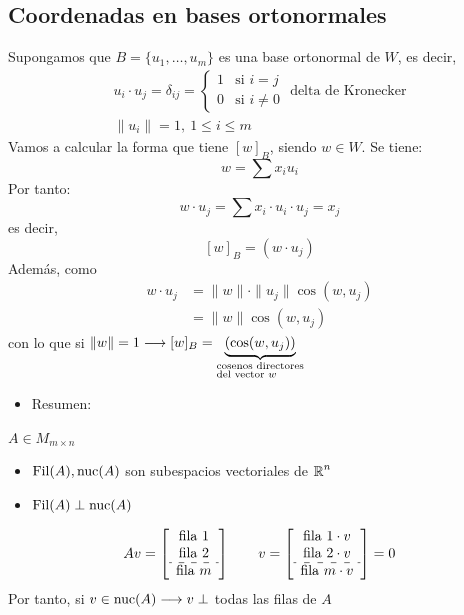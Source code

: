 \subsection{Coordenadas en bases ortonormales}
Supongamos que $B=\{u_1,\dots,u_m\}$ es una base ortonormal de $W$, es decir, \[ \begin{array}{l}
	u_i\cdot u_j=\delta_{ij}=\begin{cases}
		1 & \text{si }i=j\\
		0 & \text{si }i\neq0
	\end{cases}\text{ delta de Kronecker}\\
	\|u_i\|=1,\:1\le i\le m
\end{array} \]
Vamos a calcular la forma que tiene $[w]_B$, siendo $w\in W$. Se tiene: \[ w=\sum x_iu_i \]Por tanto: \[w\cdot u_j=\sum x_i\cdot u_i\cdot u_j=x_j \]es decir, \[ [w]_B=(w\cdot u_j) \]
Además, como \[\begin{aligned}
	w\cdot u_j&=\|w\|\cdot\|u_j\|\cos(w,u_j)\\
	&=\|w\|\cos(w,u_j)
\end{aligned}\] con lo que si $\|w\|=1\longrightarrow[w]_B=\underbrace{\left(\cos(w,u_j)\right)}_{\begin{subarray}{l}
	\text{cosenos directores}\\
	\text{del vector $w$}
	\end{subarray}}$

\begin{itemize}[label=\color{red}\textbullet, leftmargin=*]
	\item \color{lightblue}Resumen: 
\end{itemize}

$A\in M_{m\times n}$
\begin{itemize}
	\item $\operatorname{\mathrm{Fil}}(A),\operatorname{\mathrm{nuc}}(A)$ son subespacios vectoriales de $\operatorname{\mathbb{R}}^n$
	\item $\operatorname{\mathrm{Fil}}(A)\perp\operatorname{\mathrm{nuc}}(A)$
\end{itemize}

\[ Av=\left[\begin{array}{c}
	\text{fila }1\\
	\text{fila }2\\ \hdashline
	\text{fila }m\\
\end{array}\right]\qquad v=\left[\begin{array}{c}
\text{fila }1\cdot v\\
\text{fila }2\cdot v\\ \hdashline
\text{fila }m\cdot v
\end{array}\right]=0 \]
Por tanto, si $v\in\operatorname{\mathrm{nuc}}(A)\longrightarrow v\perp$ todas las filas de $A$


